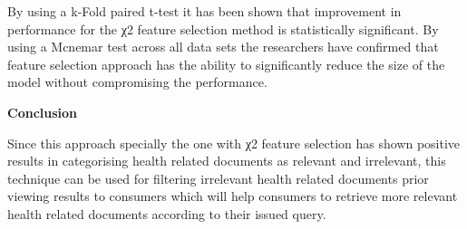 \documentclass[]{article}
\begin{document}
By using a k-Fold paired t-test it has been shown that improvement in performance for the χ2 feature selection method is statistically significant. By using a Mcnemar test across all data sets the researchers have confirmed that feature selection approach has the ability to significantly reduce the size of the model without compromising the performance.

\textbf{Conclusion}

Since this approach specially the one with χ2 feature selection has shown positive results in categorising health related documents as relevant and irrelevant, this technique can be used for filtering irrelevant health related documents prior viewing results to consumers which will help consumers to retrieve more relevant health related documents according to their issued query.  
\end{document}
